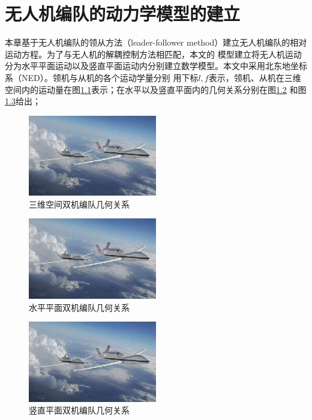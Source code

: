 \chapter{无人机编队的动力学模型的建立}
\label{chap:formation_dynamic_equ}
本章基于无人机编队的领从方法（leader-follower method）建立无人机编队的相对运动方程。为了与无人机的解耦控制方法相匹配，本文的
模型建立将无人机运动分为水平平面运动以及竖直平面运动内分别建立数学模型。本文中采用北东地坐标系（NED）。领机与从机的各个运动学量分别
用下标$l,f$表示，领机、从机在三维空间内的运动量在图\ref{fig:c02-3d_rel_motion}表示；在水平以及竖直平面内的几何关系分别在图\ref{fig:c02-2d_level_motion}
和图\ref{fig:c02-2d_vert_motion}给出；
\begin{figure}
    \centering
    \includegraphics[width=0.5\textwidth]{figures/c01-meaning-1}
    \caption{三维空间双机编队几何关系}\label{fig:c02-3d_rel_motion}
\end{figure}
\begin{figure}
    \centering
    \includegraphics[width=0.5\textwidth]{figures/c01-meaning-1}
    \caption{水平平面双机编队几何关系}\label{fig:c02-2d_level_motion}
\end{figure}
\begin{figure}
    \centering
    \includegraphics[width=0.5\textwidth]{figures/c01-meaning-1}
    \caption{竖直平面双机编队几何关系}\label{fig:c02-2d_vert_motion}
\end{figure}